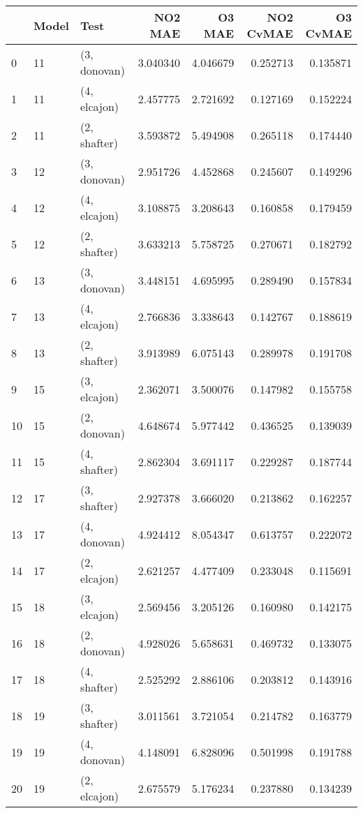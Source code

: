 \begin{tabular}{lllrrrr}
\toprule
{} & Model &          Test &   NO2 MAE &    O3 MAE &  NO2 CvMAE &  O3 CvMAE \\
\midrule
0  &    11 &  (3, donovan) &  3.040340 &  4.046679 &   0.252713 &  0.135871 \\
1  &    11 &  (4, elcajon) &  2.457775 &  2.721692 &   0.127169 &  0.152224 \\
2  &    11 &  (2, shafter) &  3.593872 &  5.494908 &   0.265118 &  0.174440 \\
3  &    12 &  (3, donovan) &  2.951726 &  4.452868 &   0.245607 &  0.149296 \\
4  &    12 &  (4, elcajon) &  3.108875 &  3.208643 &   0.160858 &  0.179459 \\
5  &    12 &  (2, shafter) &  3.633213 &  5.758725 &   0.270671 &  0.182792 \\
6  &    13 &  (3, donovan) &  3.448151 &  4.695995 &   0.289490 &  0.157834 \\
7  &    13 &  (4, elcajon) &  2.766836 &  3.338643 &   0.142767 &  0.188619 \\
8  &    13 &  (2, shafter) &  3.913989 &  6.075143 &   0.289978 &  0.191708 \\
9  &    15 &  (3, elcajon) &  2.362071 &  3.500076 &   0.147982 &  0.155758 \\
10 &    15 &  (2, donovan) &  4.648674 &  5.977442 &   0.436525 &  0.139039 \\
11 &    15 &  (4, shafter) &  2.862304 &  3.691117 &   0.229287 &  0.187744 \\
12 &    17 &  (3, shafter) &  2.927378 &  3.666020 &   0.213862 &  0.162257 \\
13 &    17 &  (4, donovan) &  4.924412 &  8.054347 &   0.613757 &  0.222072 \\
14 &    17 &  (2, elcajon) &  2.621257 &  4.477409 &   0.233048 &  0.115691 \\
15 &    18 &  (3, elcajon) &  2.569456 &  3.205126 &   0.160980 &  0.142175 \\
16 &    18 &  (2, donovan) &  4.928026 &  5.658631 &   0.469732 &  0.133075 \\
17 &    18 &  (4, shafter) &  2.525292 &  2.886106 &   0.203812 &  0.143916 \\
18 &    19 &  (3, shafter) &  3.011561 &  3.721054 &   0.214782 &  0.163779 \\
19 &    19 &  (4, donovan) &  4.148091 &  6.828096 &   0.501998 &  0.191788 \\
20 &    19 &  (2, elcajon) &  2.675579 &  5.176234 &   0.237880 &  0.134239 \\

\end{tabular}
